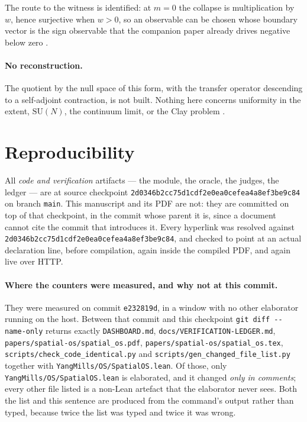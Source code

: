 \documentclass[11pt]{article}
\theoremstyle{definition}
\newcommand{\anchor}{2d0346b2cc75d1cdf2e0ea0cefea4a8ef3be9c84}
\newcommand{\SU}{\mathrm{SU}}
\begin{document}
The route to the witness is identified: at $m=0$ the collapse is multiplication
by $w$, hence surjective when $w>0$, so an observable can be chosen whose
boundary vector is the sign observable that the companion paper already drives
negative below zero \cite{ErikssonRefl}.

\paragraph{No reconstruction.}  The quotient by the null space of this form,
with the transfer operator descending to a self-adjoint contraction, is not
built.  Nothing here concerns uniformity in the extent, $\SU(N)$, the continuum
limit, or the Clay problem \cite{Clay}.

\section{Reproducibility}\label{sec:repro}

All \emph{code and verification} artifacts --- the module, the oracle, the
judges, the ledger --- are at source checkpoint \texttt{\anchor} on branch
\texttt{main}.  This manuscript and its PDF are not: they are committed on top of
that checkpoint, in the commit whose parent it is, since a document cannot cite
the commit that introduces it.  Every hyperlink was resolved against
\texttt{\anchor}, and checked to point at an actual declaration line, before
compilation, again inside the compiled PDF, and again live over HTTP.

\paragraph{Where the counters were measured, and why not at this commit.}  They
were measured on commit \texttt{e232819d}, in a window with no other elaborator
running on the host.  Between that commit and this checkpoint \verb|git diff --name-only| returns exactly \texttt{DASHBOARD.md}, \texttt{docs/VERIFICATION-LEDGER.md}, \texttt{papers/spatial-os/spatial\_os.pdf}, \texttt{papers/spatial-os/spatial\_os.tex}, \texttt{scripts/check\_code\_identical.py} and \texttt{scripts/gen\_changed\_file\_list.py} together with \texttt{YangMills/OS/SpatialOS.lean}.  Of those, only \texttt{YangMills/OS/SpatialOS.lean} is elaborated, and it changed \emph{only in comments}; every
other file listed is a non-Lean artefact that the elaborator never sees.  Both
the list and this sentence are produced from the command's output rather than
typed, because twice the list was typed and twice it was wrong.
\end{document}
